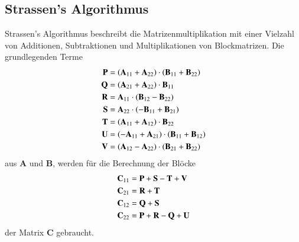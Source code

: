 \subsection{Strassen's Algorithmus}

Strassen's Algorithmus \cite{multiplikation:strassen_1969} beschreibt die Matrizenmultiplikation mit einer Vielzahl von Additionen, Subtraktionen und Multiplikationen von Blockmatrizen.
Die grundlegenden Terme
\begin{equation} \label{multiplikation:eq:strassen}
\begin{split}
\text{\textbf{P}}   &= \left(\mathbf{A}_{11} + \mathbf{A}_{22}\right ) \cdot \left(\mathbf{B}_{11} + \mathbf{B}_{22}\right ) \\
\text{\textbf{Q}}  &= \left(\mathbf{A}_{21} + \mathbf{A}_{22}\right ) \cdot \mathbf{B}_{11} \\
\text{\textbf{R}} &= \mathbf{A}_{11} \cdot \left(\mathbf{B}_{12}-\mathbf{B}_{22}\right ) \\
\text{\textbf{S}}  &= \mathbf{A}_{22} \cdot \left(-\mathbf{B}_{11}+\mathbf{B}_{21}\right ) \\
\text{\textbf{T}}   &= \left(\mathbf{A}_{11} + \mathbf{A}_{12}\right ) \cdot \mathbf{B}_{22} \\
\text{\textbf{U}}  &= \left(-\mathbf{A}_{11} + \mathbf{A}_{21}\right ) \cdot \left(\mathbf{B}_{11} + \mathbf{B}_{12}\right ) \\
\text{\textbf{V}} &= \left(\mathbf{A}_{12} - \mathbf{A}_{22}\right ) \cdot \left(\mathbf{B}_{21} + \mathbf{B}_{22}\right )
\end{split}
\end{equation}
aus $\mathbf{A}$ und $\mathbf{B}$, werden f\"ur die Berechnung der Bl\"ocke 
\begin{equation} \label{multiplikation:eq:strassen2}
\begin{split}
\mathbf{C}_{11} &= \text{\textbf{P}} + \text{\textbf{S}} - \text{\textbf{T}} + \text{\textbf{V}} \\
\mathbf{C}_{21} &= \text{\textbf{R}} + \text{\textbf{T}} \\
\mathbf{C}_{12} &= \text{\textbf{Q}} + \text{\textbf{S}}\\
\mathbf{C}_{22} &= \text{\textbf{P}} + \text{\textbf{R}} - \text{\textbf{Q}} + \text{\textbf{U}}
\end{split}
\end{equation}
der Matrix $\mathbf{C}$ gebraucht.
